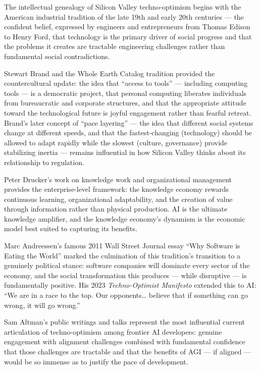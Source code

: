 The intellectual genealogy of Silicon Valley techno-optimism begins with
the American industrial tradition of the late 19th and early 20th
centuries --- the confident belief, expressed by engineers and
entrepreneurs from Thomas Edison to Henry Ford, that technology is the
primary driver of social progress and that the problems it creates are
tractable engineering challenges rather than fundamental social
contradictions.

Stewart Brand and the Whole Earth Catalog tradition provided the
countercultural update: the idea that ``access to tools'' --- including
computing tools --- is a democratic project, that personal computing
liberates individuals from bureaucratic and corporate structures, and
that the appropriate attitude toward the technological future is joyful
engagement rather than fearful retreat. Brand's later concept of ``pace
layering'' --- the idea that different social systems change at
different speeds, and that the fastest-changing (technology) should be
allowed to adapt rapidly while the slowest (culture, governance) provide
stabilizing inertia --- remains influential in how Silicon Valley thinks
about its relationship to regulation.

Peter Drucker's work on knowledge work and organizational management
provides the enterprise-level framework: the knowledge economy rewards
continuous learning, organizational adaptability, and the creation of
value through information rather than physical production. AI is the
ultimate knowledge amplifier, and the knowledge economy's dynamism is
the economic model best suited to capturing its benefits.

Marc Andreessen's famous 2011 Wall Street Journal essay ``Why Software
is Eating the World'' marked the culmination of this tradition's
transition to a genuinely political stance: software companies will
dominate every sector of the economy, and the social transformation this
produces --- while disruptive --- is fundamentally positive. His 2023
\emph{Techno-Optimist Manifesto} extended this to AI: ``We are in a race
to the top. Our opponents\ldots{} believe that if something can go
wrong, it will go wrong.''

Sam Altman's public writings and talks represent the most influential
current articulation of techno-optimism among frontier AI developers:
genuine engagement with alignment challenges combined with fundamental
confidence that those challenges are tractable and that the benefits of
AGI --- if aligned --- would be so immense as to justify the pace of
development.

